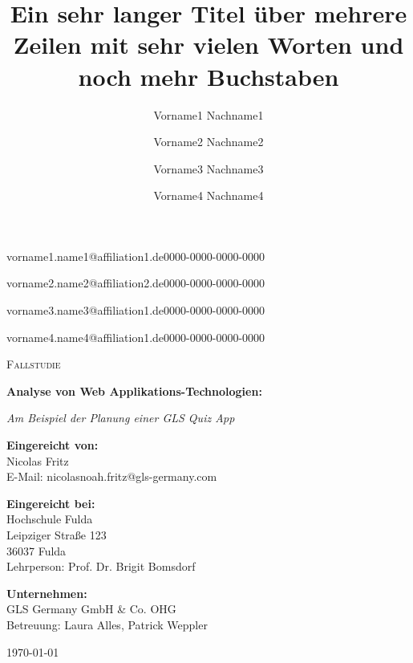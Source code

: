 \documentclass[biblatex]{lni}
\begin{document}
  \title[Ein Kurztitel]{Ein sehr langer Titel über mehrere Zeilen mit sehr vielen Worten und noch mehr Buchstaben}
  \author[1]{Vorname1 Nachname1}{vorname1.name1@affiliation1.de}{0000-0000-0000-0000}
  \author[2]{Vorname2 Nachname2}{vorname2.name2@affiliation2.de}{0000-0000-0000-0000}
  \author[1]{Vorname3 Nachname3}{vorname3.name3@affiliation1.de}{0000-0000-0000-0000}
  \author[1]{Vorname4 Nachname4}{vorname4.name4@affiliation1.de}{0000-0000-0000-0000}%

  \begin{titlepage}
    \centering
    \vspace*{0.5cm}

    {\scshape\LARGE Fallstudie \par}

    {\huge\bfseries
    Analyse von Web Applikations-Technologien:
    \par
    }
    {\Large\itshape Am Beispiel der Planung einer GLS Quiz App\par}

    \vspace{1cm}

    {\Large\textbf{Eingereicht von: }}\\
    Nicolas Fritz \\
    E-Mail: nicolasnoah.fritz@gls-germany.com

    \vspace{1cm}

    {\Large\textbf{Eingereicht bei: }}\\
    Hochschule Fulda \\
    Leipziger Straße 123 \\
    36037 Fulda \\
    Lehrperson: Prof. Dr. Brigit Bomsdorf

    \vspace{1cm}

    {\Large\textbf{Unternehmen: }}\\
    GLS Germany GmbH & Co. OHG \\
    Betreuung: Laura Alles, Patrick Weppler

    \vfill

    {\large \today\par}
  \end{titlepage}
\end{document}
